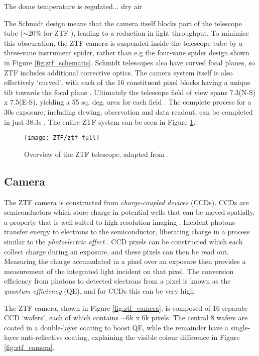 The dome temperature is regulated...   dry air

The Schmidt design means that the camera itself blocks part of the telescope tube ($\sim 20\%$ for ZTF \cite{ztf_obs_system}), leading to a reduction in light throughput. To minimise this obscuration, the ZTF camera is suspended inside the telescope tube by a three-vane instrument spider, rather than e.g the four-vane spider design shown in Figure \ref{fig:ztf_schematic}.  Schmidt telescopes also have curved focal planes, so ZTF includes additional corrective optics. The camera system itself is also effectively `curved', with each of the 16 constituent pixel blocks having a unique tilt towards the focal plane \cite{ztf_system}. Ultimately the telescope field of view spans 7.3\arcdeg (N-S) x 7.5\arcdeg (E-S), yielding a 55 sq. deg. area for each field \cite{ztf_obs_system}. The complete process for a 30s exposure, including slewing, observation and data readout, can be completed in just 38.3s  \cite{ztf_system}. The entire ZTF system can be seen in Figure \ref{fig:ztf_diagram}.

\begin{figure}[!ht]
	\centering \texttt{[image: ZTF/ztf\_full]}
	\caption{Overview of the ZTF telescope, adapted from \cite{ztf_obs_system}.}
	\label{fig:ztf_diagram}
\end{figure}

\subsection*{Camera}

The ZTF camera is constructed from \emph{charge-coupled devices} (CCDs). CCDs are semiconductors which store charge in potential wells that can be moved spatially, a property that is well-suited to high-resolution imaging . Incident photons transfer energy to electrons to the semiconductor, liberating charge in a process similar to the \emph{photoelectric effect} . CCD pixels can be constructed which each collect charge during an exposure, and these pixels can then be read out. Measuring the charge accumulated in a pixel over an exposure then provides a measurement of the integrated light incident on that pixel. The conversion efficiency from photons to detected electrons from a pixel is known as the \emph{quantum efficiency} (QE), and for CCDs this can be very high. 

The ZTF camera, shown in Figure \ref{fig:ztf_camera}, is composed of 16 separate CCD `wafers', each of which contains $\sim$6k x 6k pixels. The central 8 wafers are coated in a double-layer coating to boost QE, whle the remainder have a single-layer anti-reflective coating, explaining the visible colour difference in Figure \ref{fig:ztf_camera}.

